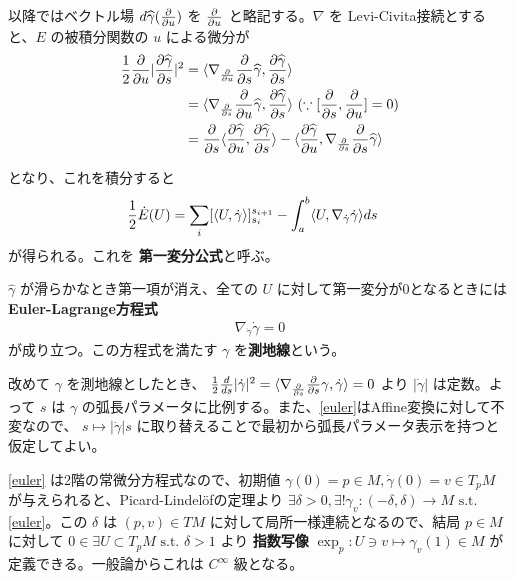 \documentclass[dvipdfmx,a4paper]{jsreport}
\theoremstyle{definition}
\newcommand{\der}{\partial}
\renewcommand{\hat}{\widehat}
\begin{document}
以降ではベクトル場 $d\hat{\gamma}({\der \over \der u})$ を ${\der \over \der u}$ と略記する。$\nabla$ を Levi-Civita接続とすると、$E$ の被積分関数の $u$ による微分が
\begin{align*}
    {1 \over 2}{\der \over \der u}|{\der \hat{\gamma} \over \der s}|^2 &= \langle \nabla_{\der \over \der u}{\der \over \der s}\hat{\gamma},{\der \hat{\gamma} \over \der s}\rangle \\
    &= \langle \nabla_{\der \over \der s}{\der \over \der u}\hat{\gamma},{\der \hat{\gamma} \over \der s}\rangle \ ( \because [{\der \over \der s},{\der \over \der u}]=0) \\
    &= {\der \over \der s} \langle {\der\hat{\gamma} \over \der u},{\der\hat{\gamma} \over \der s} \rangle-\langle {\der \hat{\gamma} \over \der u},\nabla_{\der \over \der s}{\der \over \der s}\hat{\gamma} \rangle
\end{align*}

となり、これを積分すると
\begin{align}\label{1stvar}
    {1 \over 2}\dot{E}(U) &= \sum_i [\langle U,\dot{\gamma} \rangle]_{s_i}^{s_{i+1}}-\int_{a}^b \langle U,\nabla_{\dot{\gamma}}\dot{\gamma} \rangle ds
\end{align}
が得られる。これを \textbf{第一変分公式}と呼ぶ。

$\hat{\gamma}$ が滑らかなとき第一項が消え、全ての $U$ に対して第一変分が0となるときには \textbf{Euler-Lagrange方程式}
\begin{align}\label{euler}
    \nabla_{\dot{\gamma}}\dot{\gamma}=0
\end{align}
が成り立つ。この方程式を満たす $\gamma$ を\textbf{測地線}という。


改めて $\gamma$ を測地線としたとき、 ${1 \over 2}{d \over ds}|\dot{\gamma}|^2=\langle \nabla_{\der \over \der s}{\der \over \der s} \gamma,\dot{\gamma} \rangle=0$ より $|\dot{\gamma}|$ は定数。よって $s$ は $\gamma$ の弧長パラメータに比例する。また、\eqref{euler}はAffine変換に対して不変なので、 $s\mapsto |\dot{\gamma}|s$ に取り替えることで最初から弧長パラメータ表示を持つと仮定してよい。

\eqref{euler} は2階の常微分方程式なので、初期値 $\gamma(0)=p \in M,\dot{\gamma}(0)=v \in T_pM$ が与えられると、Picard-Lindel\"{o}fの定理より $\exists \delta>0,\exists! \gamma_v:(-\delta,\delta) \to M \mbox{ s.t. }$ \eqref{euler}。この $\delta$ は $(p,v) \in TM$ に対して局所一様連続となるので、結局 $p \in M$ に対して $0 \in \exists U \subset T_pM \mbox{ s.t. }\delta>1$ より \textbf{指数写像} $\exp_p:U \ni v \mapsto \gamma_v(1) \in M$ が定義できる。一般論からこれは $C^\infty$ 級となる。
\end{document}
